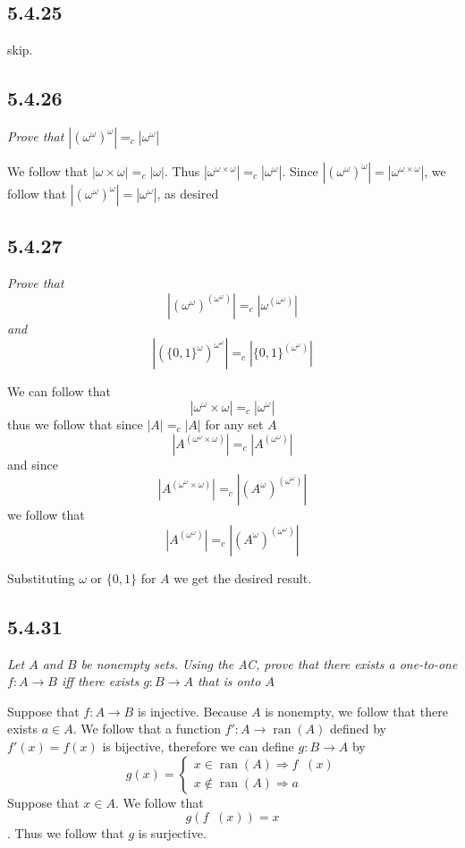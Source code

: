 \documentclass[11pt,oneside,titlepage]{book}
\DeclareMathOperator \inv {^{-1}}
\DeclareMathOperator \ra {\Rightarrow}
\DeclareMathOperator \ran {ran}
\begin{document}
\subsection*{5.4.25}

skip.

\subsection*{5.4.26}

\textit{Prove that $|(\omega^\omega)^\omega| =_c |\omega^\omega|$}

We follow that $|\omega \times \omega| =_c |\omega|$. Thus
$|\omega^{\omega \times \omega}| =_c |\omega^\omega|$. Since
$|(\omega^\omega)^\omega|  = |\omega^{\omega \times \omega}|$, we follow that
$|(\omega^\omega)^\omega| = |\omega^\omega|$, as desired

\subsection*{5.4.27}

\textit{Prove that
$$|(\omega^\omega)^{(\omega^\omega)}| =_c|\omega^{(\omega^\omega)}|$$
and
$$|(\{0, 1\}^\omega)^{\omega^\omega}| =_c|\{0, 1\}^{(\omega^\omega)}|$$
}

We can follow that $$|\omega^{\omega} \times \omega| =_c |\omega^\omega|$$
thus we follow that since $|A| =_c |A|$ for any set $A$
$$|A^{(\omega^{\omega} \times \omega)}| =_c |A^{(\omega^\omega)}|$$
and since
$$|A^{(\omega^{\omega} \times \omega)}| =_c  |(A^\omega)^{(\omega^{\omega})}|$$
we follow that
$$|A^{(\omega^\omega)}| =_c |(A^\omega)^{(\omega^{\omega})}|$$

Substituting $\omega$ or $\{0, 1\}$ for $A$ we get the desired result.

\subsection*{5.4.31}

\textit{Let $A$ and $B$ be nonempty sets. Using the AC, prove that there
  exists a one-to-one $f: A \to B$ iff there exists $g: B \to A$ that is
  onto $A$}

Suppose that $f: A \to B$ is injective. Because $A$ is nonempty, we follow that
there exists $a \in A$. We follow that
a function $f': A \to \ran(A)$ defined by $f'(x) = f(x)$ is bijective, therefore
we can define $g: B \to A$ by
$$g(x) =
\begin{cases}
  x \in \ran(A) \ra f\inv(x) \\
  x \notin \ran(A) \ra a
\end{cases}
$$
Suppose that $x \in A$. We follow that $$g(f\inv(x)) = x$$. Thus we follow that
$g$ is surjective.
\end{document}
